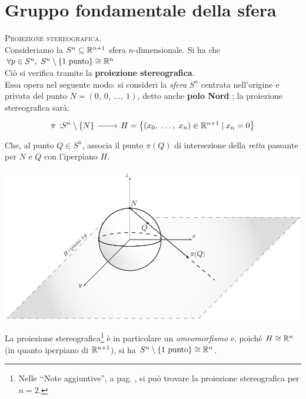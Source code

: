 \section{Gruppo fondamentale della sfera}
\begin{observe} \textsc{Proiezione stereografica.} \\
	Consideriamo la $S^n\subseteq \mathbb{R}^{n+1}$ sfera $n$-dimensionale. Si ha che $\forall p\in S^n,\ S^n\setminus \{1\text{ punto}\}\cong \mathbb{R}^n$\\
	Ciò si verifica tramite la \textbf{proiezione stereografica}.\\
	Essa opera nel seguente modo: si consideri la \textit{sfera} $S^n$ centrata nell'origine e privata del punto $N=(0,\ 0,\ \ldots,\ 1)$, detto anche \textbf{polo Nord} ; la proiezione stereografica sarà:
	\begin{equation}
		\funz {\pi}{S^n\setminus\{N\}}{H=\left\{\left(x_0,\ \ldots,\ x_n\right)\in\realset^{n+1}\mid x_n=0\right\}}
	\end{equation}
	 Che, al punto $Q\in S^n$, associa il punto $\pi\left(Q\right)$ di intersezione della \textit{retta} passante per $N$ e $Q$ con l'iperpiano $H$.
	\begin{center}
	\includegraphics[trim=0cm 0cm 0cm 0cm,clip,scale=0.8]{images/stereo.pdf}
	\end{center}
	 La proiezione stereografica\footnote{Nelle ‘‘Note aggiuntive'', a pag. \pageref{proiezionestereograficanote}, si può trovare la proiezione stereografica per $n=2$.} è in particolare un \textit{omeomorfismo} e, poiché $H\cong\mathbb{R}^n$ (in quanto iperpiano di $\mathbb{R}^{n+1}$), si ha $S^n\setminus \{1\text{ punto}\}\cong \mathbb{R}^n$.
\end{observe}
\begin{corollary} \label{sfere sempl. connesse}
\end{corollary}
